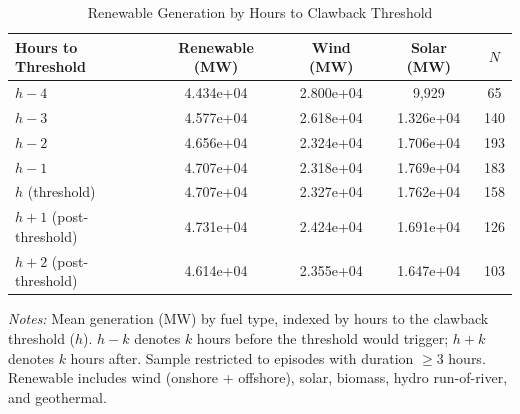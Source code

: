 \begin{table}[t]
\centering
\caption{Renewable Generation by Hours to Clawback Threshold}
\label{tab:profiles}
\begin{tabular}{lcccc}
\hline\hline
Hours to Threshold & Renewable (MW) & Wind (MW) & Solar (MW) & $N$ \\
\hline
$h - 4$ & 4.434e+04 & 2.800e+04 & 9,929 & 65 \\
$h - 3$ & 4.577e+04 & 2.618e+04 & 1.326e+04 & 140 \\
$h - 2$ & 4.656e+04 & 2.324e+04 & 1.706e+04 & 193 \\
$h - 1$ & 4.707e+04 & 2.318e+04 & 1.769e+04 & 183 \\
$h$ (threshold) & 4.707e+04 & 2.327e+04 & 1.762e+04 & 158 \\
$h + 1$ (post-threshold) & 4.731e+04 & 2.424e+04 & 1.691e+04 & 126 \\
$h + 2$ (post-threshold) & 4.614e+04 & 2.355e+04 & 1.647e+04 & 103 \\
\hline\hline
\end{tabular}
\begin{tablenotes}[flushleft]
\footnotesize
\item \textit{Notes:} Mean generation (MW) by fuel type, indexed by hours to the clawback threshold ($h$). $h - k$ denotes $k$ hours before the threshold would trigger; $h + k$ denotes $k$ hours after. Sample restricted to episodes with duration $\geq 3$ hours. Renewable includes wind (onshore + offshore), solar, biomass, hydro run-of-river, and geothermal.
\end{tablenotes}
\end{table}
